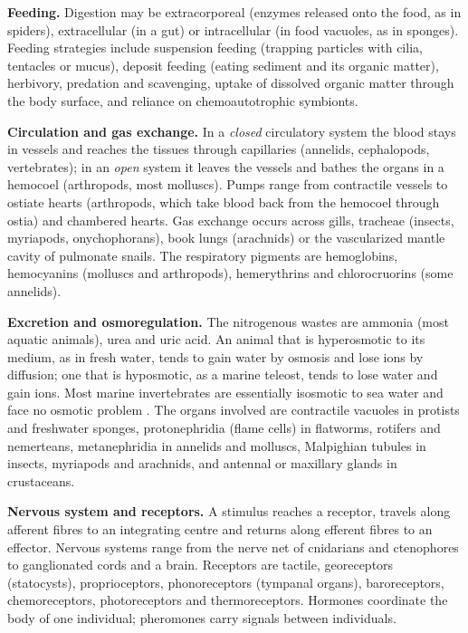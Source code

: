 \textbf{Feeding.} Digestion may be
extracorporeal (enzymes released onto the
food, as in spiders), extracellular (in a
gut) or intracellular (in food vacuoles, as
in sponges). Feeding strategies include
suspension feeding (trapping particles with
cilia, tentacles or mucus), deposit feeding
(eating sediment and its organic matter),
herbivory, predation and scavenging, uptake
of dissolved organic matter through the body
surface, and reliance on chemoautotrophic
symbionts.

\textbf{Circulation and gas exchange.} In a
\emph{closed} circulatory system the blood
stays in vessels and reaches the tissues
through capillaries (annelids, cephalopods,
vertebrates); in an \emph{open} system it
leaves the vessels and bathes the organs in a
hemocoel (arthropods, most molluscs). Pumps
range from contractile vessels to ostiate
hearts (arthropods, which take blood back
from the hemocoel through ostia) and
chambered hearts. Gas exchange occurs across
gills, tracheae (insects, myriapods,
onychophorans), book lungs (arachnids) or the
vascularized mantle cavity of pulmonate
snails. The respiratory pigments are
hemoglobins, hemocyanins (molluscs and
arthropods), hemerythrins and chlorocruorins
(some annelids).

\textbf{Excretion and osmoregulation.} The
nitrogenous wastes are ammonia (most aquatic
animals), urea and uric acid. An animal that
is hyperosmotic to its medium, as in fresh
water, tends to gain water by osmosis and
lose ions by diffusion; one that is
hyposmotic, as a marine teleost, tends to
lose water and gain ions. Most marine
invertebrates are essentially isosmotic to
sea water and face no osmotic problem
\cite[Chapter 28]{hill2012animal}. The organs
involved are contractile vacuoles in protists
and freshwater sponges, protonephridia (flame
cells) in flatworms, rotifers and nemerteans,
metanephridia in annelids and molluscs,
Malpighian tubules in insects, myriapods and
arachnids, and antennal or maxillary glands
in crustaceans.

\textbf{Nervous system and receptors.} A
stimulus reaches a receptor, travels along
afferent fibres to an integrating centre and
returns along efferent fibres to an effector.
Nervous systems range from the nerve net of
cnidarians and ctenophores to ganglionated
cords and a brain. Receptors are tactile,
georeceptors (statocysts), proprioceptors,
phonoreceptors (tympanal organs),
baroreceptors, chemoreceptors, photoreceptors
and thermoreceptors. Hormones coordinate the
body of one individual; pheromones carry
signals between individuals.

